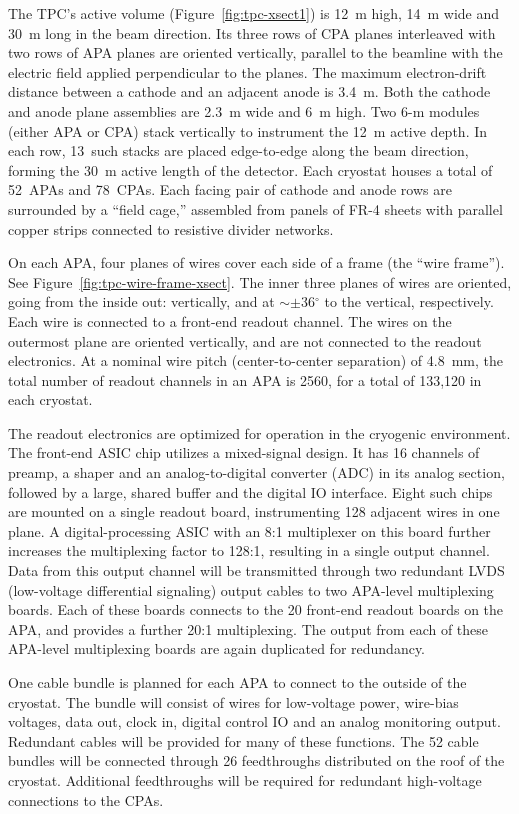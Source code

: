 The TPC's active volume (Figure~\ref{fig:tpc-xsect1}) is 12~m high, 14~m wide and 30~m long in the beam direction. 
Its three rows of CPA planes interleaved with two rows of APA planes 
are oriented vertically, parallel to the beamline with the  
electric field applied perpendicular to the planes.
The maximum electron-drift distance between a cathode and an adjacent 
anode is 3.4~m. Both the cathode and anode plane assemblies are 
2.3~m wide and 6~m high. Two 6-m modules (either APA or CPA)  stack vertically to 
instrument the 12~m active depth. In each row, 13~such stacks are placed 
edge-to-edge 
along the beam direction, forming the 30~m active length of the detector.
Each cryostat houses a total of 52~APAs and 78~CPAs.
Each facing pair of cathode and anode rows are surrounded by a 
``field cage,'' assembled from panels of FR-4 sheets with parallel copper strips connected to resistive divider networks. 

On each APA, four planes of wires cover each side of a frame (the ``wire frame''). See Figure~\ref{fig:tpc-wire-frame-xsect}.
The inner three planes of wires are oriented, going from the inside out: vertically, and at $\sim\pm$36$^\circ$ 
to the vertical, respectively. Each wire is connected to a front-end readout channel.
The wires on the outermost plane are oriented vertically, and are not connected to the readout electronics.
At a nominal wire pitch (center-to-center separation) of 4.8~mm,
the total number of readout channels in an APA is 2560, for a total of 133,120 in each cryostat.
 
The readout electronics are optimized for operation in the cryogenic environment.  
The front-end ASIC chip utilizes a mixed-signal design.  
It has 16 channels of preamp, a shaper and an analog-to-digital converter (ADC) in its analog section,  
followed by a large, shared buffer and the digital IO interface. Eight such chips 
are mounted on a single readout board, instrumenting 128 adjacent wires in one plane. 
A digital-processing ASIC with an 8:1 multiplexer on this board further 
increases the multiplexing factor to 128:1, resulting in a single output channel. Data from this output channel will be transmitted 
through two redundant LVDS (low-voltage differential signaling) output cables to two APA-level multiplexing boards.  Each of these boards connects to the 20 front-end readout boards on the APA, and provides a further 20:1 multiplexing.  The output from each of these APA-level multiplexing boards are again duplicated for redundancy.


One cable bundle is planned for each APA to connect to the outside of the cryostat. The bundle will consist of wires for low-voltage power, wire-bias voltages, data out, clock in, digital control IO and an analog monitoring output. Redundant cables will be provided for many of these functions. The 52 cable bundles will be connected through 26 feedthroughs distributed on the roof of the cryostat. Additional feedthroughs will be required for redundant high-voltage connections to the CPAs. 


